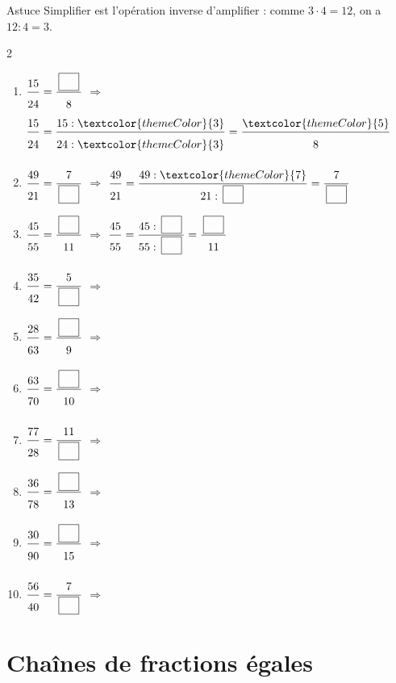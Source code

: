 \newpage

\vspace{10pt}


\vspace{5pt}\begin{astuce}{Astuce}
Simplifier est l'opération inverse d'amplifier : comme $3 \cdot 4 = 12$, on a $12 : 4 = 3$.
\end{astuce}\vspace{10pt}

\begin{multicols}{2}
\begin{enumerate}[leftmargin=*,align=parleft, label=\alph*), itemsep=9pt]
\item $\FA{15}{24}=\FA{\CaseC}{8}$ \quad $\Longrightarrow$ \quad $\FA{15}{24}=\FA{15 : \textcolor{themeColor}{3}}{24 : \textcolor{themeColor}{3}}=\FA{\textcolor{themeColor}{5}}{8}$
\item $\FA{49}{21}=\FA{7}{\CaseC}$ \quad $\Longrightarrow$ \quad $\FA{49}{21}=\FA{49 : \textcolor{themeColor}{7}}{21 : \CaseC}=\FA{7}{\CaseC}$
\item $\FA{45}{55}=\FA{\CaseC}{11}$ \quad $\Longrightarrow$ \quad $\FA{45}{55}=\FA{45 : \CaseC}{55 : \CaseC}=\FA{\CaseC}{11}$
\item $\FA{35}{42}=\FA{5}{\CaseC}$ \quad $\Longrightarrow$
\item $\FA{28}{63}=\FA{\CaseC}{9}$ \quad $\Longrightarrow$
\item $\FA{63}{70}=\FA{\CaseC}{10}$ \quad $\Longrightarrow$
\item $\FA{77}{28}=\FA{11}{\CaseC}$ \quad $\Longrightarrow$
\item $\FA{36}{78}=\FA{\CaseC}{13}$ \quad $\Longrightarrow$
\item $\FA{30}{90}=\FA{\CaseC}{15}$ \quad $\Longrightarrow$
\item $\FA{56}{40}=\FA{7}{\CaseC}$ \quad $\Longrightarrow$
\end{enumerate}
\end{multicols}

\vfill
\section{Chaînes de fractions égales}\label{sec:ChaineFractions}

